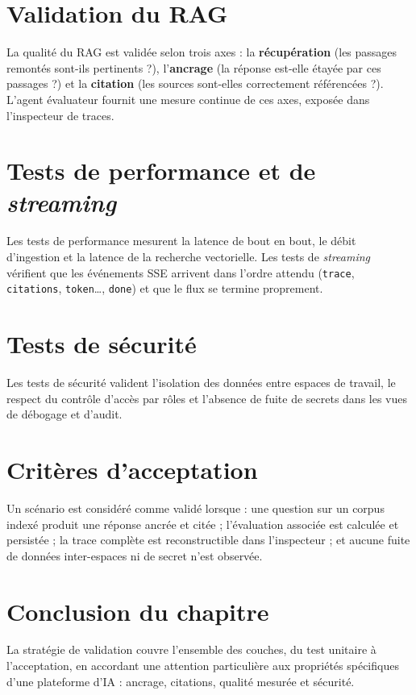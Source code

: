 \documentclass[12pt,a4paper,oneside]{report}
\newcommand{\code}[1]{\texttt{\small #1}}
\begin{document}
\section{Validation du RAG}
La qualité du RAG est validée selon trois axes : la \textbf{récupération}
(les passages remontés sont-ils pertinents ?), l'\textbf{ancrage} (la réponse
est-elle étayée par ces passages ?) et la \textbf{citation} (les sources sont-elles
correctement référencées ?). L'agent évaluateur fournit une mesure continue de ces
axes, exposée dans l'inspecteur de traces.

\section{Tests de performance et de \emph{streaming}}
Les tests de performance mesurent la latence de bout en bout, le débit
d'ingestion et la latence de la recherche vectorielle. Les tests de
\emph{streaming} vérifient que les événements SSE arrivent dans l'ordre attendu
(\code{trace}, \code{citations}, \code{token}\dots, \code{done}) et que le flux se
termine proprement.

\section{Tests de sécurité}
Les tests de sécurité valident l'isolation des données entre espaces de travail,
le respect du contrôle d'accès par rôles et l'absence de fuite de secrets dans les
vues de débogage et d'audit.

\section{Critères d'acceptation}
Un scénario est considéré comme validé lorsque : une question sur un corpus indexé
produit une réponse ancrée et citée ; l'évaluation associée est calculée et
persistée ; la trace complète est reconstructible dans l'inspecteur ; et aucune
fuite de données inter-espaces ni de secret n'est observée.

\section{Conclusion du chapitre}
La stratégie de validation couvre l'ensemble des couches, du test unitaire à
l'acceptation, en accordant une attention particulière aux propriétés
spécifiques d'une plateforme d'IA : ancrage, citations, qualité mesurée et
sécurité.

\end{document}
